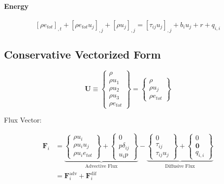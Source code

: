 \documentclass[11pt, letterpaper, twoside]{article}
\newcommand{\etot}{e_{tot}}
\renewcommand{\vec}[1]{\bm{#1}}
\newcommand{\U}{\vec{U}}
\newcommand{\F}{\vec{F}}
\begin{document}
    \paragraph{Energy}
        \begin{equation}\label{eq:fund_energy}
            \left[\rho \etot \right]_{,t} + 
            \left[\rho \etot u_j \right]_{,j} + \left[\rho u_j \right]_{,j} 
            = \left[\tau_{ij} u_j \right]_{,j} + b_i u_j + r + q_{i,i}
        \end{equation}
    
    \subsection{Conservative Vectorized Form}

    \begin{equation}
        \U \equiv
        \begin{Bmatrix}
            \rho \\
            \rho u_1 \\
            \rho u_2 \\
            \rho u_3 \\
            \rho \etot
        \end{Bmatrix}
        =
        \begin{Bmatrix}
            \rho \\
            \rho u_j \\
            \rho \etot
        \end{Bmatrix}
    \end{equation}

    Flux Vector:

    \begin{equation}
        \begin{split}
        \F_i & = 
        \underbrace{
        \begin{Bmatrix}
            \rho u_i \\
            \rho u_i u_j \\
            \rho u_i \etot
        \end{Bmatrix}
        + \begin{Bmatrix}
            0 \\
            p \delta_{ij}\\
            u_i p
        \end{Bmatrix} }_{\text{Advective Flux}}
        - \underbrace{ \begin{Bmatrix}
            0 \\
            \tau_{ij}\\
            \tau_{ij} u_j 
        \end{Bmatrix}
        + \begin{Bmatrix}
            0 \\
            \vec{0} \\
            q_{i,i}
        \end{Bmatrix} }_{\text{Diffusive Flux}} \\
        & = \F_i^{\text{adv}} + \F_i^{\text{dif}}
        \end{split}
    \end{equation}
\end{document}
